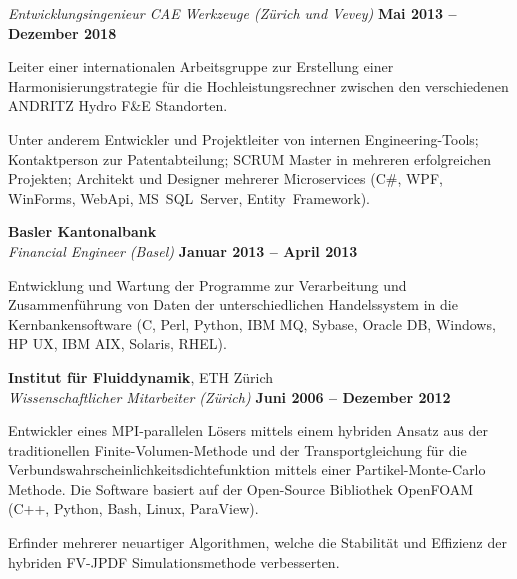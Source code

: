 \documentclass[line,11pt,a4paper]{resume}
\begin{document}
\begin{resume}
\textsl{Entwicklungsingenieur CAE Werkzeuge (Zürich und Vevey)}
  \hfill \textbf{Mai 2013 -- Dezember 2018}\\
\vspace{-4mm}%
\begin{list2}
  \item Leiter einer internationalen Arbeitsgruppe zur Erstellung
    einer Harmonisierungstrategie für die Hochleistungsrechner zwischen den
    verschiedenen ANDRITZ Hydro F\&E Standorten.

  \item Unter anderem Entwickler und Projektleiter von internen
    Engineering-Tools; Kontaktperson zur Patentabteilung; SCRUM Master in
    mehreren erfolgreichen Projekten; Architekt und Designer mehrerer
    Microservices (C\#, WPF, WinForms, WebApi, MS~SQL~Server,
    Entity~Framework).
\end{list2}

\textbf{Basler Kantonalbank}\\\vspace{1mm}%
\textsl{Financial Engineer (Basel)}
  \hfill \textbf{Januar 2013 -- April 2013}\\
\vspace{-4mm}%
\begin{list2}
  \item Entwicklung und Wartung der Programme zur Verarbeitung und
    Zusammenführung von Daten der unterschiedlichen Handelssystem in die
    Kernbankensoftware (C, Perl, Python, IBM MQ, Sybase, Oracle DB, Windows, HP
    UX, IBM AIX, Solaris, RHEL).
\end{list2}

\textbf{Institut für Fluiddynamik}, ETH Zürich\\\vspace{1mm}%
\textsl{Wissenschaftlicher Mitarbeiter (Zürich)}
  \hfill \textbf{Juni 2006 -- Dezember 2012}\\
\vspace{-4mm}%
\begin{list2}
  \item Entwickler eines MPI-parallelen Lösers mittels einem hybriden Ansatz aus
    der traditionellen Finite-Volumen-Methode und der Transportgleichung für
    die Verbundswahrscheinlichkeitsdichtefunktion mittels einer
    Partikel-Monte-Carlo Methode. Die Software basiert auf der Open-Source
    Bibliothek OpenFOAM (C++, Python, Bash, Linux, ParaView).

  \item Erfinder mehrerer neuartiger Algorithmen, welche die Stabilität und
    Effizienz der hybriden FV-JPDF Simulationsmethode verbesserten.
\end{list2}


\end{resume}
\end{document}
